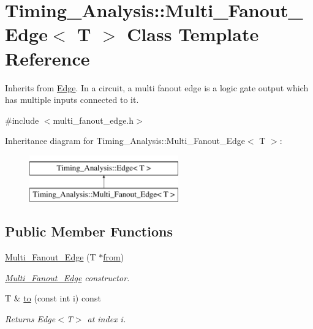 \hypertarget{classTiming__Analysis_1_1Multi__Fanout__Edge}{\section{Timing\-\_\-\-Analysis\-:\-:Multi\-\_\-\-Fanout\-\_\-\-Edge$<$ T $>$ Class Template Reference}
\label{classTiming__Analysis_1_1Multi__Fanout__Edge}
}


Inherits from \hyperlink{classTiming__Analysis_1_1Edge}{Edge}. In a circuit, a multi fanout edge is a logic gate output which has multiple inputs connected to it.  




{\ttfamily \#include $<$multi\-\_\-fanout\-\_\-edge.\-h$>$}

Inheritance diagram for Timing\-\_\-\-Analysis\-:\-:Multi\-\_\-\-Fanout\-\_\-\-Edge$<$ T $>$\-:\begin{figure}[H]
\begin{center}
\leavevmode
\includegraphics[height=2.000000cm]{classTiming__Analysis_1_1Multi__Fanout__Edge}
\end{center}
\end{figure}
\subsection*{Public Member Functions}
\begin{DoxyCompactItemize}
\item 
\hyperlink{classTiming__Analysis_1_1Multi__Fanout__Edge_a877f7672fb4fbabf49943fd3c86b7f59}{Multi\-\_\-\-Fanout\-\_\-\-Edge} (T $\ast$\hyperlink{classTiming__Analysis_1_1Edge_a47020ea89fd9fde438adc814a731a23d}{from})
\begin{DoxyCompactList}\small\item\em \hyperlink{classTiming__Analysis_1_1Multi__Fanout__Edge}{Multi\-\_\-\-Fanout\-\_\-\-Edge} constructor. \end{DoxyCompactList}\item 
T \& \hyperlink{classTiming__Analysis_1_1Multi__Fanout__Edge_a77ac79088e9ef11d222e777e2963f676}{to} (const int i) const 
\begin{DoxyCompactList}\small\item\em Returns Edge$<$\-T$>$ at index i. \end{DoxyCompactList}\end{DoxyCompactItemize}
